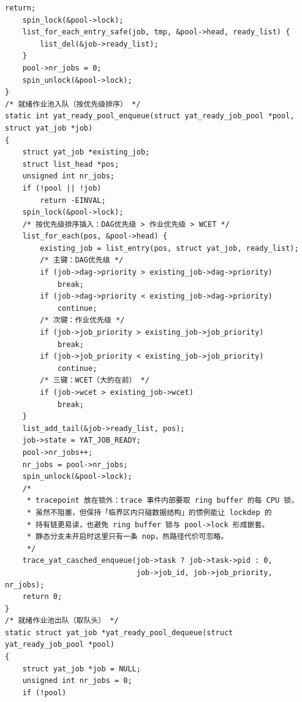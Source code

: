 \documentclass[10pt,a4paper]{article}
\newenvironment{yatpage}{\vspace*{0pt}}{\par}
\begin{document}
\newpage
\begin{yatpage}
\begin{Verbatim}[fontsize=\fontsize{8.2}{9.8}\selectfont]
        return;
    spin_lock(&pool->lock);
    list_for_each_entry_safe(job, tmp, &pool->head, ready_list) {
        list_del(&job->ready_list);
    }
    pool->nr_jobs = 0;
    spin_unlock(&pool->lock);
}
/* 就绪作业池入队（按优先级排序） */
static int yat_ready_pool_enqueue(struct yat_ready_job_pool *pool, struct yat_job *job)
{
    struct yat_job *existing_job;
    struct list_head *pos;
    unsigned int nr_jobs;
    if (!pool || !job)
        return -EINVAL;
    spin_lock(&pool->lock);
    /* 按优先级排序插入：DAG优先级 > 作业优先级 > WCET */
    list_for_each(pos, &pool->head) {
        existing_job = list_entry(pos, struct yat_job, ready_list);
        /* 主键：DAG优先级 */
        if (job->dag->priority > existing_job->dag->priority)
            break;
        if (job->dag->priority < existing_job->dag->priority)
            continue;
        /* 次键：作业优先级 */
        if (job->job_priority > existing_job->job_priority)
            break;
        if (job->job_priority < existing_job->job_priority)
            continue;
        /* 三键：WCET（大的在前） */
        if (job->wcet > existing_job->wcet)
            break;
    }
    list_add_tail(&job->ready_list, pos);
    job->state = YAT_JOB_READY;
    pool->nr_jobs++;
    nr_jobs = pool->nr_jobs;
    spin_unlock(&pool->lock);
    /*
     * tracepoint 放在锁外：trace 事件内部要取 ring buffer 的每 CPU 锁，
     * 虽然不阻塞，但保持「临界区内只碰数据结构」的惯例能让 lockdep 的
     * 持有链更易读，也避免 ring buffer 锁与 pool->lock 形成嵌套。
     * 静态分支未开启时这里只有一条 nop，热路径代价可忽略。
     */
    trace_yat_casched_enqueue(job->task ? job->task->pid : 0,
                              job->job_id, job->job_priority, nr_jobs);
    return 0;
}
/* 就绪作业池出队（取队头） */
static struct yat_job *yat_ready_pool_dequeue(struct yat_ready_job_pool *pool)
{
    struct yat_job *job = NULL;
    unsigned int nr_jobs = 0;
    if (!pool)
\end{Verbatim}
\end{yatpage}
\newpage
\end{document}
